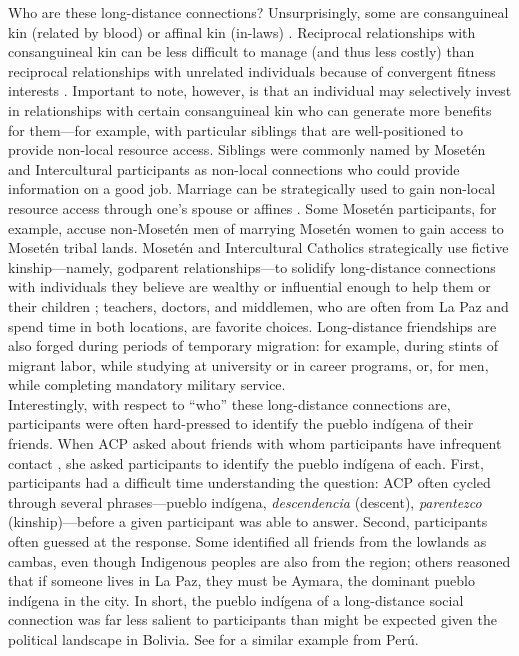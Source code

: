 \documentclass[bibauthoryear]{aa}
\begin{document}
	Who are these long-distance connections? Unsurprisingly, some are consanguineal kin (related by blood) or affinal kin (in-laws) \citep{pisorjones2020}. Reciprocal relationships with consanguineal kin can be less difficult to manage (and thus less costly) than reciprocal relationships with unrelated individuals because of convergent fitness interests \citep{hruschka2010}. Important to note, however, is that an individual may selectively invest in relationships with certain consanguineal kin who can generate more benefits for them---for example, with particular siblings that are well-positioned to provide non-local resource access. Siblings were commonly named by Moset\'en and Intercultural participants as non-local connections who could provide information on a good job. Marriage can be strategically used to gain non-local resource access through one's spouse or affines \citep{pisor2019evolution, chapais2009primeval}. Some Moset\'en participants, for example, accuse non-Moset\'en men of marrying Moset\'en women to gain access to Moset\'en tribal lands. Moset\'en and Intercultural Catholics strategically use fictive kinship---namely, godparent relationships---to solidify long-distance connections with individuals they believe are wealthy or influential enough to help them or their children \citep{mintz1950analysis}; teachers, doctors, and middlemen, who are often from La Paz and spend time in both locations, are favorite choices. Long-distance friendships are also forged during periods of temporary migration: for example, during stints of migrant labor, while studying at university or in career programs, or, for men, while completing mandatory military service.\\
\indent	
	Interestingly, with respect to ``who'' these long-distance connections are, participants were often hard-pressed to identify the pueblo ind\'igena of their friends. When ACP asked about friends with whom participants have infrequent contact \citep{pisorjones2020}, she asked participants to identify the pueblo ind\'igena of each. First, participants had a difficult time understanding the question: ACP often cycled through several phrases---pueblo ind\'igena, \textit{descendencia} (descent), \textit{parentezco} (kinship)---before a given participant was able to answer. Second, participants often guessed at the response. Some identified all friends from the lowlands as cambas, even though Indigenous peoples are also from the region; others reasoned that if someone lives in La Paz, they must be Aymara, the dominant pueblo ind\'igena in the city. In short, the pueblo ind\'igena of a long-distance social connection was far less salient to participants than might be expected given the political landscape in Bolivia. See \citet{moya2015different} for a similar example from Per\'u.
\end{document}
